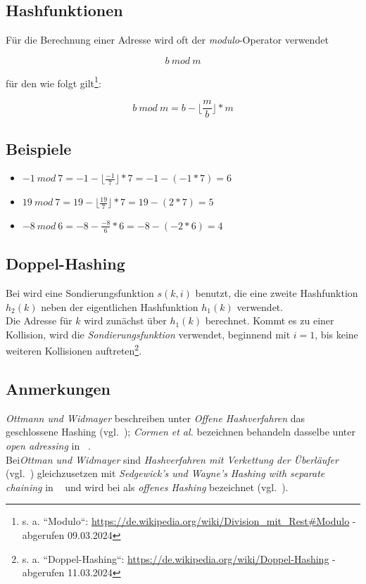 \subsection{Hashfunktionen}

Für die Berechnung einer Adresse wird oft der \textit{modulo}-Operator verwendet

\begin{equation}
    b\ mod\ m
\end{equation}

\noindent
für den wie folgt gilt\footnote{
s. a. ``Modulo``: \url{https://de.wikipedia.org/wiki/Division_mit_Rest#Modulo} - abgerufen 09.03.2024
}:

\begin{equation}
    b\ mod\ m = b - \lfloor \frac{m}{b} \rfloor * m
\end{equation}

\subsection*{Beispiele}

\begin{itemize}
    \item $-1\ mod\ 7 = -1 - \lfloor \frac{-1}{7} \rfloor * 7 =  -1 - (-1 * 7) = 6$
    \item $19\ mod\ 7 = 19 - \lfloor \frac{19}{7} \rfloor * 7 =  19 - (2 * 7) = 5$
    \item $-8\ mod\ 6 = -8 - \frac{-8}{6} * 6 = -8 - (-2 * 6) = 4$
\end{itemize}

\subsection{Doppel-Hashing}
Bei  wird eine Sondierungsfunktion $s(k, i)$ benutzt, die eine zweite Hashfunktion $h_2(k)$ neben der eigentlichen Hashfunktion $h_1(k)$ verwendet.\\
Die Adresse für $k$ wird zunächst über $h_1(k)$ berechnet.
Kommt es zu einer Kollision, wird die \textit{Sondierungsfunktion} verwendet, beginnend mit $i=1$, bis keine weiteren Kollisionen auftreten\footnote{
s. a. ``Doppel-Hashing``: \url{https://de.wikipedia.org/wiki/Doppel-Hashing} - abgerufen 11.03.2024
}.


\subsection{Anmerkungen}
\textit{Ottmann und Widmayer} beschreiben unter \textit{Offene Hashverfahren} das geschlossene Hashing (vgl.~\cite[203 ff.]{OW17d}); \textit{Cormen et al.} bezeichnen behandeln dasselbe unter \textit{open adressing} in ~\cite[293 ff.]{CL22}.\\

\noindent
Bei\textit{Ottman und Widmayer} sind \textit{Hashverfahren mit Verkettung der Überläufer} (vgl.~\cite[198 ff.]{OW17d}) gleichzusetzen mit \textit{Sedgewick's und Wayne's} \textit{Hashing with separate  chaining} in ~\cite[464 ff.]{SW11} und wird bei  als \textit{offenes Hashing} bezeichnet (vgl.~\cite[116]{GD18d}).
